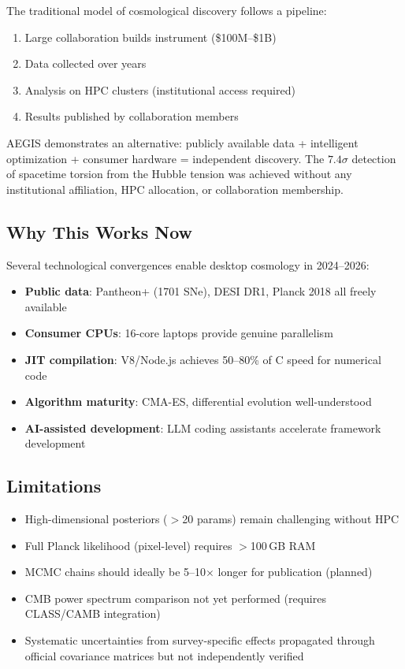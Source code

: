 \documentclass[twocolumn,showpacs,preprintnumbers,amsmath,amssymb,prl]{revtex4-2}
\begin{document}
The traditional model of cosmological discovery follows a pipeline:
\begin{enumerate}
\item Large collaboration builds instrument (\$100M--\$1B)
\item Data collected over years
\item Analysis on HPC clusters (institutional access required)
\item Results published by collaboration members
\end{enumerate}

AEGIS demonstrates an alternative: publicly available data + intelligent optimization + consumer hardware = independent discovery. The $7.4\sigma$ detection of spacetime torsion from the Hubble tension was achieved without any institutional affiliation, HPC allocation, or collaboration membership.

\subsection{Why This Works Now}

Several technological convergences enable desktop cosmology in 2024--2026:
\begin{itemize}
\item \textbf{Public data}: Pantheon+ (1701 SNe), DESI DR1, Planck 2018 all freely available
\item \textbf{Consumer CPUs}: 16-core laptops provide genuine parallelism
\item \textbf{JIT compilation}: V8/Node.js achieves 50--80\% of C speed for numerical code
\item \textbf{Algorithm maturity}: CMA-ES, differential evolution well-understood
\item \textbf{AI-assisted development}: LLM coding assistants accelerate framework development
\end{itemize}

\subsection{Limitations}

\begin{itemize}
\item High-dimensional posteriors ($>$20 params) remain challenging without HPC
\item Full Planck likelihood (pixel-level) requires $>$100\,GB RAM
\item MCMC chains should ideally be 5--10$\times$ longer for publication (planned)
\item CMB power spectrum comparison not yet performed (requires CLASS/CAMB integration)
\item Systematic uncertainties from survey-specific effects propagated through official covariance matrices but not independently verified
\end{itemize}
\end{document}
